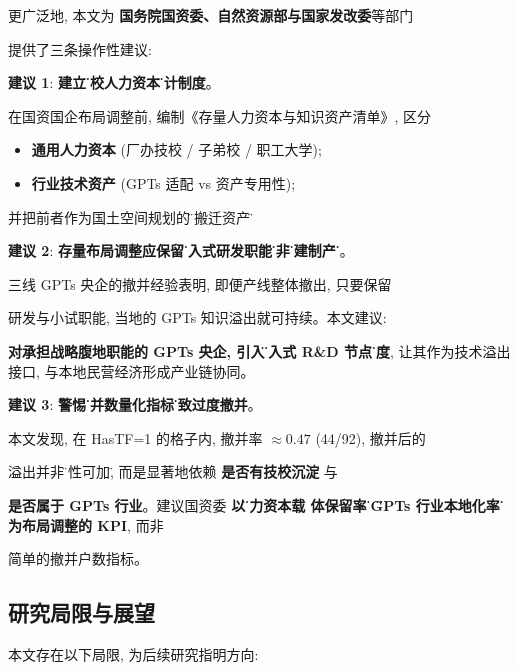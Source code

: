 更广泛地, 本文为 \textbf{国务院国资委、自然资源部与国家发改委}等部门

       提供了三条操作性建议:



\textbf{建议 1}: \textbf{建立\"技校人力资本\"审计制度}。

       在国资国企布局调整前, 编制《存量人力资本与知识资产清单》, 区分

       \begin{itemize}

       \item \textbf{通用人力资本} (厂办技校 / 子弟校 / 职工大学);

       \item \textbf{行业技术资产} (GPTs 适配 vs 资产专用性);

       \end{itemize}

       并把前者作为国土空间规划的\"非搬迁资产\"。



\textbf{建议 2}: \textbf{存量布局调整应保留\"嵌入式研发职能\"而非\"整建制产线\"}。

       三线 GPTs 央企的撤并经验表明, 即便产线整体撤出, 只要保留

       研发与小试职能, 当地的 GPTs 知识溢出就可持续。本文建议:

       \textbf{对承担战略腹地职能的 GPTs 央企, 引入\"嵌入式 R\&D 节点\"
       制度}, 让其作为技术溢出接口, 与本地民营经济形成产业链协同。



\textbf{建议 3}: \textbf{警惕\"撤并数量化指标\"导致过度撤并}。

       本文发现, 在 HasTF=1 的格子内, 撤并率 $\approx 0.47$ (44/92), 撤并后的

       溢出并非\"线性可加\", 而是显著地依赖 \textbf{是否有技校沉淀} 与

       \textbf{是否属于 GPTs 行业}。建议国资委 \textbf{以\"人力资本载
       体保留率\"和\"GPTs 行业本地化率\"作为布局调整的 KPI}, 而非

       简单的撤并户数指标。



\subsection{研究局限与展望}



本文存在以下局限, 为后续研究指明方向:



